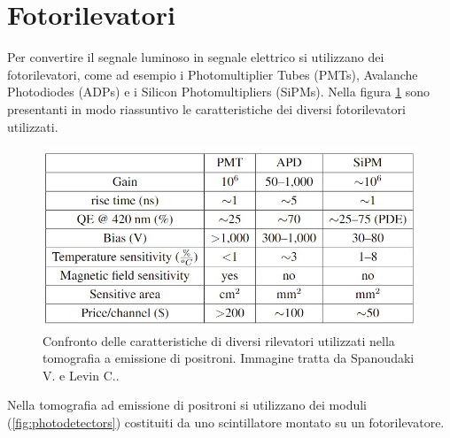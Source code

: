 \section{Fotorilevatori}
Per convertire il segnale luminoso in segnale elettrico si utilizzano dei fotorilevatori, come ad esempio i Photomultiplier Tubes (PMTs), Avalanche Photodiodes (ADPs) e i Silicon Photomultipliers (SiPMs). Nella figura \ref{fig:photodetectors_performance} sono presentanti in modo riassuntivo le caratteristiche dei diversi fotorilevatori utilizzati.
\begin{figure}[tbh]
	\centering
	\includegraphics[width=0.7\linewidth]{./ImageFiles/table_pet_detectors_properties.jpg}
	\caption{Confronto delle caratteristiche di diversi rilevatori utilizzati nella tomografia a emissione di positroni. Immagine tratta da Spanoudaki V. e Levin C.\cite{Spanoudaki2010}.} 
	\label{fig:photodetectors_performance}
\end{figure}
Nella tomografia ad emissione di positroni si utilizzano dei moduli (\Fig\ref{fig:photodetectors}) costituiti da uno scintillatore montato su un fotorilevatore.
